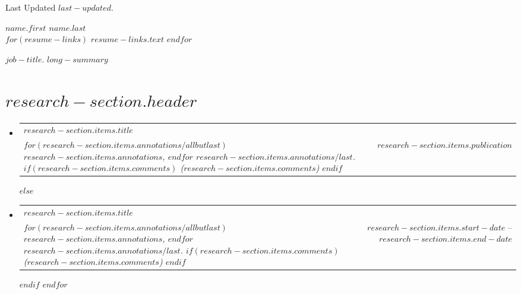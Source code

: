 \documentclass[letterpaper,11pt]{article}
\makeatletter
\newcommand{\sectionItem}[3]{
    \item
    \begin{tabular*}{0.97\textwidth}{l@{\extracolsep{\fill}}r}
      \small\textbf{#1} \\ \textbar \footnotesize\emph{#2} & #3 \\
    \end{tabular*}\vspace{-7pt}
}
\newcommand{\sectionItemsListStart}{\begin{itemize}[leftmargin=0.15in, label={}]}
\newcommand{\sectionItemsListEnd}{\end{itemize}}
\makeatother
\begin{document}
\begin{flushright}
    \color{gray}
    \item
    Last Updated $last-updated$.
  \end{flushright}
  
  \vspace{-5pt}
  
  \begin{center}
      \textbf{\Huge \scshape $name.first$ $name.last$} \\ \vspace{8pt}
      \small 
      $for(resume-links)$
      \href{$resume-links.link$}{\underline{$resume-links.text$}}\hspace{5pt}
      $endfor$
  \end{center}

  \textbf{$job-title$}. \emph{$long-summary$}

  \section{$research-section.header$}\label{$research-section.label$}
  \sectionItemsListStart
  $for(research-section.items)$
    $if(research-section.items.publication)$ %
      \sectionItem
      {$research-section.items.title$}
      {
        $for(research-section.items.annotations/allbutlast)$
        $research-section.items.annotations$, $endfor$
        $research-section.items.annotations/last$.
        $if(research-section.items.comments)$
        ($research-section.items.comments$)
        $endif$
      }
      { 
        \href{$research-section.items.publication-link$}{
        \textbf{$research-section.items.publication$}}
      }
    $else$ %
      \sectionItem
      {$research-section.items.title$}
      {
        $for(research-section.items.annotations/allbutlast)$
        $research-section.items.annotations$, $endfor$
        $research-section.items.annotations/last$.
        $if(research-section.items.comments)$
        ($research-section.items.comments$)
        $endif$
      }
      {
        $research-section.items.start-date$ -- $research-section.items.end-date$
      }
    $endif$
  $endfor$
  \sectionItemsListEnd
\end{document}
